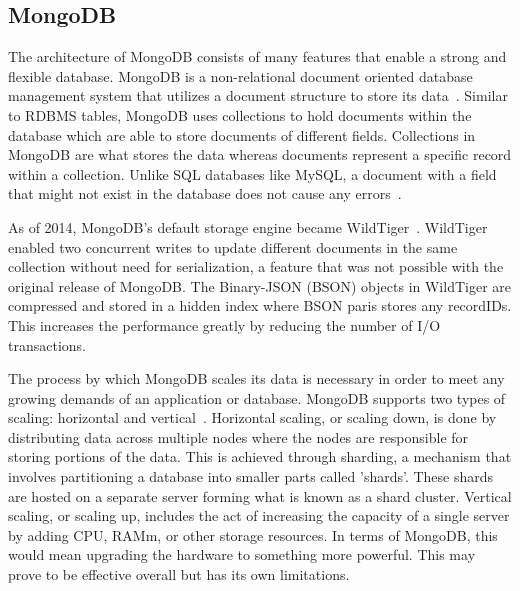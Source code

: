 \documentclass[sigconf]{acmart}
\begin{document}
   \subsection{MongoDB}
   The architecture of MongoDB consists of many features that enable a strong and flexible database. MongoDB is a non-relational document oriented database management system that utilizes a document structure to store its data~\cite{Geeks4geeksMongo}. Similar to RDBMS tables, MongoDB uses collections to hold documents within the database which are able to store documents of different fields. Collections in MongoDB are what stores the data whereas documents represent a specific record within a collection. Unlike SQL databases like MySQL, a document with a field that might not exist in the database does not cause any errors~\cite{Mongo-Medium}.
  
   As of 2014, MongoDB's default storage engine became WildTiger~\cite{Mongo-Medium}. WildTiger enabled two concurrent writes to update different documents in the same collection without need for serialization, a feature that was not possible with the original release of MongoDB. The Binary-JSON (BSON) objects in WildTiger are compressed and stored in a hidden index where BSON paris stores any recordIDs. This increases the performance greatly by reducing the number of I/O transactions.


   The process by which MongoDB scales its data is necessary in order to meet any growing demands of an application or database. MongoDB supports two types of scaling: horizontal and vertical~\cite{Mongo-scalability}. Horizontal scaling, or scaling down, is done by distributing data across multiple nodes where the nodes are responsible for storing portions of the data. This is achieved through sharding, a mechanism that involves partitioning a database into smaller parts called 'shards'. These shards are hosted on a separate server forming what is known as a shard cluster. Vertical scaling, or scaling up, includes the act of increasing the capacity of a single server by adding CPU, RAMm, or other storage resources. In terms of MongoDB, this would mean upgrading the hardware to something more powerful. This may prove to be effective overall but has its own limitations.
  
\end{document}
